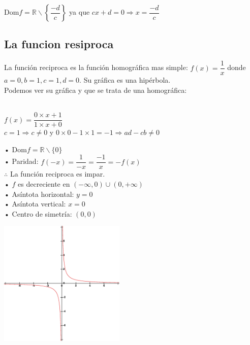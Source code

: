 Dom$f = \mathbb{R} \smallsetminus \left\{\dfrac{-d}{c}\right\}$ \qquad ya que \quad $cx+d=0 \Rightarrow x=\dfrac{-d}{c}$ 

\subsection{La funcion resiproca}

La función reciproca es la función homográfica mas simple: $f(x)= \dfrac{1}{x}$ donde $a=0, b=1, c=1, d=0$. Su gráfica es una hipérbola.\\

Podemos ver su gráfica y que se trata de una homográfica:\\
\\
\hfill
\begin{minipage}{.45\textwidth}

\begin{center}
$f(x)=\dfrac{0\times x+1}{1 \times x+0}$ \\
$ c=1 \Rightarrow c \neq 0 $ \quad y \quad $ 0 \times 0 - 1 \times 1 = -1 \Rightarrow ad-cb \neq 0 $
\end{center} 

• Dom$f = \mathbb{R} \smallsetminus \{0\}$\\
• Paridad: $f(-x)=\dfrac{1}{-x}=\dfrac{-1}{x}=-f(x)$\\
$ \therefore$ \quad La función reciproca es impar.\\
• $f$ es decreciente en $(-\infty, 0) \cup (0, +\infty)$\\
• Asíntota horizontal: $y=0$\\
• Asíntota vertical: $x=0$\\
• Centro de simetría: $(0, 0)$\\
\end{minipage}
\hfill
\begin{minipage}{.45\textwidth}
\begin{center}

\includegraphics[height=6cm,width=6cm]{frecip.eps} 

\end{center}
\end{minipage}
\hfill
\newpage
